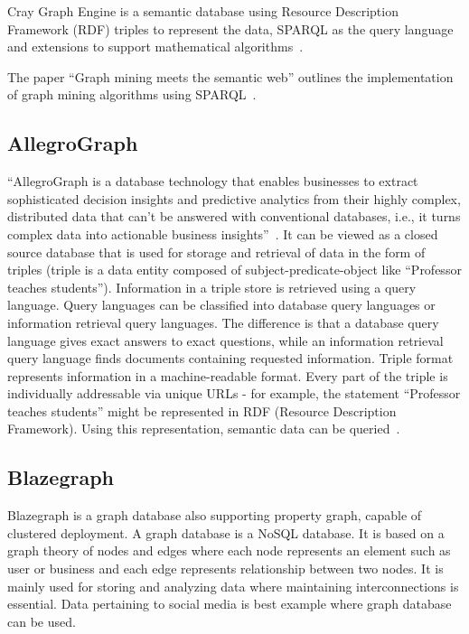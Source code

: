 Cray Graph Engine is a semantic database using Resource Description
Framework (RDF) triples to represent the data, SPARQL as the query
language and extensions to support mathematical
algorithms~\cite{paper-graph-data}.

The paper ``Graph mining meets the semantic web'' outlines the
implementation of graph mining algorithms using
SPARQL~\cite{paper-lee2015graph}.

     \pv

\subsection{AllegroGraph}
     
``AllegroGraph is a database technology that enables businesses to
extract sophisticated decision insights and predictive analytics from
their highly complex, distributed data that can't be answered with
conventional databases, i.e., it turns complex data into actionable
business insights''~\cite{www-Allegro}. It can be viewed as a closed
source database that is used for storage and retrieval of data in the
form of triples (triple is a data entity composed of
subject-predicate-object like ``Professor teaches students'').
Information in a triple store is retrieved using a query
language. Query languages can be classified into database query
languages or information retrieval query languages. The difference is
that a database query language gives exact answers to exact questions,
while an information retrieval query language finds documents
containing requested information.  Triple format represents
information in a machine-readable format.  Every part of the triple is
individually addressable via unique URLs - for example, the statement
``Professor teaches students'' might be represented in RDF (Resource
Description Framework). Using this representation, semantic data can
be queried~\cite{www-Allegrow}.

     \pv

\subsection{Blazegraph}

     Blazegraph is a graph database also supporting property graph, 
     capable of clustered deployment. A graph database is a NoSQL 
     database. It is based on a graph theory of nodes and edges where 
     each node represents an element such as user or business and each 
     edge represents relationship between two nodes. It is mainly used 
     for storing and analyzing data where maintaining interconnections 
     is essential. Data pertaining to social media is best example where 
     graph database can be used.

